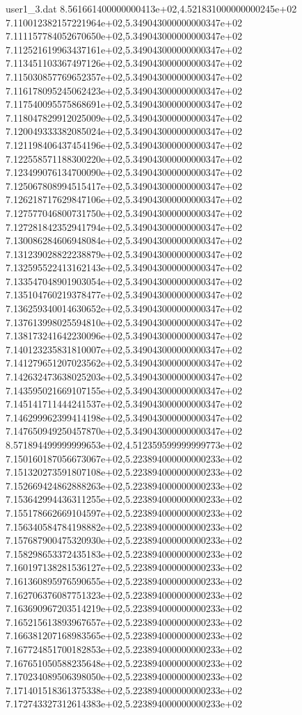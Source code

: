 \begin{filecontents}{user1_3.dat}
8.561661400000000413e+02,4.521831000000000245e+02
7.110012382157221964e+02,5.349043000000000347e+02
7.111157784052670650e+02,5.349043000000000347e+02
7.112521619963437161e+02,5.349043000000000347e+02
7.113451103367497126e+02,5.349043000000000347e+02
7.115030857769652357e+02,5.349043000000000347e+02
7.116178095245062423e+02,5.349043000000000347e+02
7.117540095575868691e+02,5.349043000000000347e+02
7.118047829912025009e+02,5.349043000000000347e+02
7.120049333382085024e+02,5.349043000000000347e+02
7.121198406437454196e+02,5.349043000000000347e+02
7.122558571188300220e+02,5.349043000000000347e+02
7.123499076134700090e+02,5.349043000000000347e+02
7.125067808994515417e+02,5.349043000000000347e+02
7.126218717629847106e+02,5.349043000000000347e+02
7.127577046800731750e+02,5.349043000000000347e+02
7.127281842352941794e+02,5.349043000000000347e+02
7.130086284606948084e+02,5.349043000000000347e+02
7.131239028822238879e+02,5.349043000000000347e+02
7.132595522413162143e+02,5.349043000000000347e+02
7.133547048901903054e+02,5.349043000000000347e+02
7.135104760219378477e+02,5.349043000000000347e+02
7.136259340014630652e+02,5.349043000000000347e+02
7.137613998025594810e+02,5.349043000000000347e+02
7.138173241642230096e+02,5.349043000000000347e+02
7.140123235831810007e+02,5.349043000000000347e+02
7.141279651207023562e+02,5.349043000000000347e+02
7.142632473638025203e+02,5.349043000000000347e+02
7.143595021669107155e+02,5.349043000000000347e+02
7.145141711444241537e+02,5.349043000000000347e+02
7.146299962399414198e+02,5.349043000000000347e+02
7.147650949250457870e+02,5.349043000000000347e+02
8.571894499999999653e+02,4.512359599999999773e+02
7.150160187056673067e+02,5.223894000000000233e+02
7.151320273591807108e+02,5.223894000000000233e+02
7.152669424862888263e+02,5.223894000000000233e+02
7.153642994436311255e+02,5.223894000000000233e+02
7.155178662669104597e+02,5.223894000000000233e+02
7.156340584784198882e+02,5.223894000000000233e+02
7.157687900475320930e+02,5.223894000000000233e+02
7.158298653372435183e+02,5.223894000000000233e+02
7.160197138281536127e+02,5.223894000000000233e+02
7.161360895976590655e+02,5.223894000000000233e+02
7.162706376087751323e+02,5.223894000000000233e+02
7.163690967203514219e+02,5.223894000000000233e+02
7.165215613893967657e+02,5.223894000000000233e+02
7.166381207168983565e+02,5.223894000000000233e+02
7.167724851700182853e+02,5.223894000000000233e+02
7.167651050588235648e+02,5.223894000000000233e+02
7.170234089506398050e+02,5.223894000000000233e+02
7.171401518361375338e+02,5.223894000000000233e+02
7.172743327312614383e+02,5.223894000000000233e+02

\end{filecontents}
